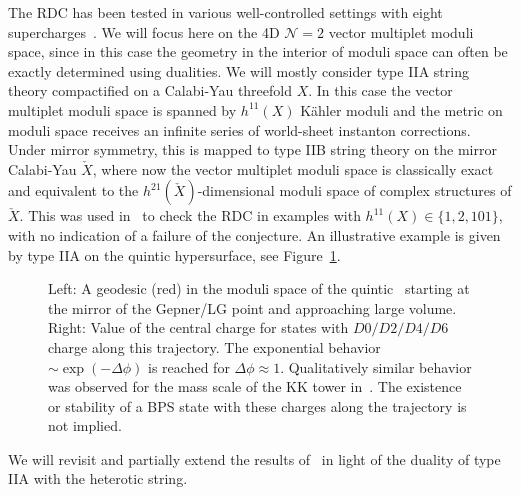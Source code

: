 \documentclass[11pt,a4paper]{article}
\numberwithin{equation}{section}
\numberwithin{table}{section}\setlength{\multlinegap}{25pt}
\begin{document}
The RDC has been tested in various well-controlled settings with eight supercharges~\cite{Blumenhagen:2018nts,Joshi:2019nzi,Erkinger:2019umg,Brodie:2021ain}. We will focus here on the 4D $\mathcal{N}=2$ vector multiplet moduli space, since in this case the geometry in the interior of moduli space can often be exactly determined using dualities. We will mostly consider type IIA string theory compactified on a Calabi-Yau threefold $X$. In this case the vector multiplet moduli space is spanned by $h^{11}(X)$ Kähler moduli and the metric on moduli space receives an infinite series of world-sheet instanton corrections. Under mirror symmetry, this is mapped to type IIB string theory on the mirror Calabi-Yau $\check{X}$, where now the vector multiplet moduli space is classically exact and equivalent to the $h^{21}(\check{X})$-dimensional moduli space of complex structures of $\check{X}$. This was used in~\cite{Blumenhagen:2018nts} to check the RDC in examples with $h^{11}(X)\in \{1,2,101\}$, with no indication of a failure of the conjecture. An illustrative example is given by type IIA on the quintic hypersurface, see Figure~\ref{fig:QuinticModuliSpace}.
\begin{figure}
    \centering
    \hspace{1cm}
    \caption{Left: A geodesic (red) in the moduli space of the quintic~\cite{Blumenhagen:2018nts,Klawer:2019czy} starting at the mirror of the Gepner/LG point and approaching large volume. Right: Value of the central charge for states with $D0/D2/D4/D6$ charge along this trajectory. The exponential behavior $\sim\exp(-\Delta\phi)$ is reached for $\Delta\phi\approx 1$. Qualitatively similar behavior was observed for the mass scale of the KK tower in~\cite{Blumenhagen:2018nts}. The existence or stability of a BPS state with these charges along the trajectory is not implied.}
    \label{fig:QuinticModuliSpace}
\end{figure}
We will revisit and partially extend the results of~\cite{Blumenhagen:2018nts} in light of the duality of type IIA with the heterotic string.
\end{document}
